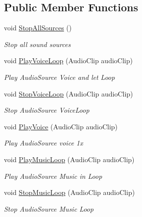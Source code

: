 \subsection*{Public Member Functions}
\begin{DoxyCompactItemize}
\item 
void \mbox{\hyperlink{class_dr_evil_1_1_mechanics_1_1_sound_controller_a3f083cb0155e8bf4b03f38a355bf153a}{Stop\+All\+Sources}} ()
\begin{DoxyCompactList}\small\item\em Stop all sound sources \end{DoxyCompactList}\item 
void \mbox{\hyperlink{class_dr_evil_1_1_mechanics_1_1_sound_controller_af59c0ca5ff1b440a01c365372a762992}{Play\+Voice\+Loop}} (Audio\+Clip audio\+Clip)
\begin{DoxyCompactList}\small\item\em Play Audio\+Source Voice and let Loop \end{DoxyCompactList}\item 
void \mbox{\hyperlink{class_dr_evil_1_1_mechanics_1_1_sound_controller_a130372d19c0564c1119a1d94281f4b7e}{Stop\+Voice\+Loop}} (Audio\+Clip audio\+Clip)
\begin{DoxyCompactList}\small\item\em Stop Audio\+Source Voice\+Loop \end{DoxyCompactList}\item 
void \mbox{\hyperlink{class_dr_evil_1_1_mechanics_1_1_sound_controller_aead795046a4bac31ed5e8a69c5447e81}{Play\+Voice}} (Audio\+Clip audio\+Clip)
\begin{DoxyCompactList}\small\item\em Play Audio\+Source voice 1x \end{DoxyCompactList}\item 
void \mbox{\hyperlink{class_dr_evil_1_1_mechanics_1_1_sound_controller_aa5c3b26d880752cbe5f46fae6bab51db}{Play\+Music\+Loop}} (Audio\+Clip audio\+Clip)
\begin{DoxyCompactList}\small\item\em Play Audio\+Source Music in Loop \end{DoxyCompactList}\item 
void \mbox{\hyperlink{class_dr_evil_1_1_mechanics_1_1_sound_controller_afdb68fc451fcdc589ee969cf0a3d3090}{Stop\+Music\+Loop}} (Audio\+Clip audio\+Clip)
\begin{DoxyCompactList}\small\item\em Stop Audio\+Source Music Loop \end{DoxyCompactList}\end{DoxyCompactItemize}
